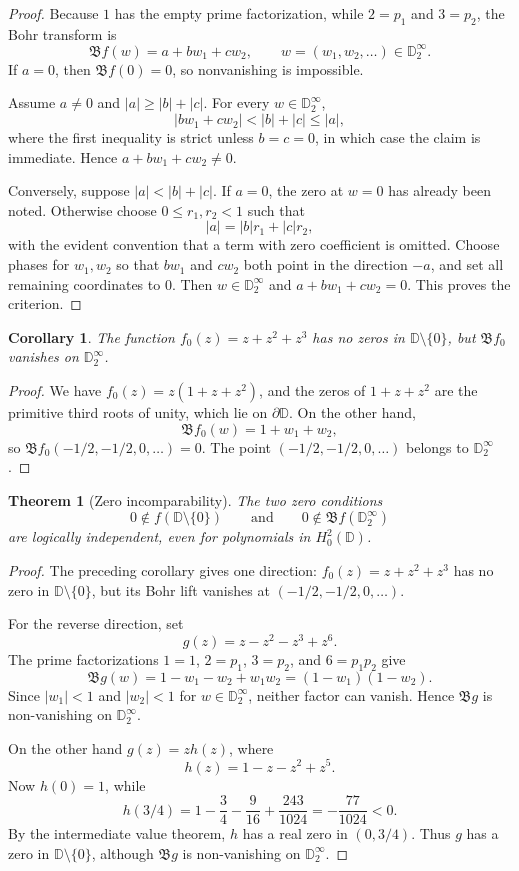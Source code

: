 \documentclass[11pt]{article}
\newtheorem{theorem}{Theorem}
\newtheorem{corollary}{Corollary}
\newcommand{\D}{\mathbb D}
\begin{document}
\begin{proof}
Because \(1\) has the empty prime factorization, while \(2=p_1\) and
\(3=p_2\), the Bohr transform is
\[
  \mathfrak Bf(w)=a+bw_1+cw_2,\qquad w=(w_1,w_2,\ldots)\in\D^\infty_2.
\]
If \(a=0\), then \(\mathfrak Bf(0)=0\), so nonvanishing is impossible.

Assume \(a\neq 0\) and \(|a|\ge |b|+|c|\).  For every
\(w\in \D^\infty_2\),
\[
  |bw_1+cw_2| < |b|+|c|\le |a|,
\]
where the first inequality is strict unless \(b=c=0\), in which case the
claim is immediate.  Hence \(a+bw_1+cw_2\neq 0\).

Conversely, suppose \(|a|<|b|+|c|\).  If \(a=0\), the zero at \(w=0\) has
already been noted.  Otherwise choose \(0\le r_1,r_2<1\) such that
\[
  |a|=|b|r_1+|c|r_2,
\]
with the evident convention that a term with zero coefficient is omitted.
Choose phases for \(w_1,w_2\) so that \(bw_1\) and \(cw_2\) both point in the
direction \(-a\), and set all remaining coordinates to \(0\).  Then
\(w\in\D^\infty_2\) and \(a+bw_1+cw_2=0\).  This proves the criterion.
\end{proof}

\begin{corollary}
The function \(f_0(z)=z+z^2+z^3\) has no zeros in \(\D\setminus\{0\}\), but
\(\mathfrak Bf_0\) vanishes on \(\D^\infty_2\).
\end{corollary}

\begin{proof}
We have \(f_0(z)=z(1+z+z^2)\), and the zeros of \(1+z+z^2\) are the primitive
third roots of unity, which lie on \(\partial\D\).  On the other hand,
\[
  \mathfrak Bf_0(w)=1+w_1+w_2,
\]
so \(\mathfrak Bf_0(-1/2,-1/2,0,\ldots)=0\).  The point
\((-1/2,-1/2,0,\ldots)\) belongs to \(\D^\infty_2\).
\end{proof}

\begin{theorem}[Zero incomparability]
The two zero conditions
\[
  0\notin f(\D\setminus\{0\})
  \qquad\text{and}\qquad
  0\notin \mathfrak Bf(\D^\infty_2)
\]
are logically independent, even for polynomials in \(H^2_0(\D)\).
\end{theorem}

\begin{proof}
The preceding corollary gives one direction: \(f_0(z)=z+z^2+z^3\) has no zero
in \(\D\setminus\{0\}\), but its Bohr lift vanishes at
\((-1/2,-1/2,0,\ldots)\).

For the reverse direction, set
\[
  g(z)=z-z^2-z^3+z^6.
\]
The prime factorizations \(1=1\), \(2=p_1\), \(3=p_2\), and \(6=p_1p_2\)
give
\[
  \mathfrak Bg(w)=1-w_1-w_2+w_1w_2=(1-w_1)(1-w_2).
\]
Since \(|w_1|<1\) and \(|w_2|<1\) for \(w\in\D^\infty_2\), neither factor
can vanish.  Hence \(\mathfrak Bg\) is non-vanishing on \(\D^\infty_2\).

On the other hand \(g(z)=z h(z)\), where
\[
  h(z)=1-z-z^2+z^5.
\]
Now \(h(0)=1\), while
\[
  h(3/4)=1-\frac34-\frac{9}{16}+\frac{243}{1024}
        =-\frac{77}{1024}<0.
\]
By the intermediate value theorem, \(h\) has a real zero in \((0,3/4)\).  Thus
\(g\) has a zero in \(\D\setminus\{0\}\), although \(\mathfrak Bg\) is
non-vanishing on \(\D^\infty_2\).
\end{proof}
\end{document}

